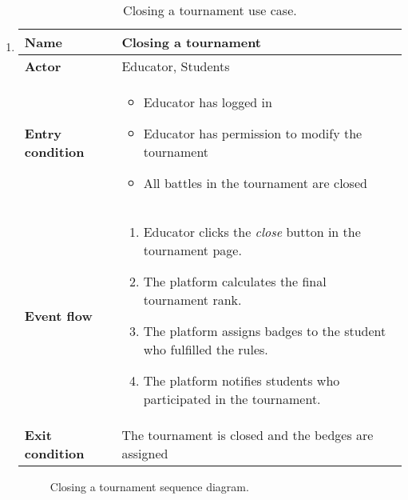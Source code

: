 \begin{enumerate}[label=\textbf{UC\arabic*}:,leftmargin=1.3cm]
    \item \textbf{}
          \begin{table}[H]
              \centering
              \begin{tabular}{|l|p{11.9cm}|}
                  \hline
                  \textbf{Name}            & Closing a tournament                                 \\\hline
                  \textbf{Actor}           & Educator, Students                                   \\\hline
                  \textbf{Entry condition} &
                  \begin{itemize}
                      \item Educator has logged in
                      \item Educator has permission to modify the tournament
                      \item All battles in the tournament are closed
                  \end{itemize}                           \\\hline
                  \textbf{Event flow}      &
                  \begin{enumerate}[label=\arabic*.]
                      \item Educator clicks the \emph{close} button in the tournament page.
                      \item The platform calculates the final tournament rank.
                      \item The platform assigns badges to the student who fulfilled the rules.
                      \item The platform notifies students who participated in the tournament.
                  \end{enumerate}        \\\hline
                  \textbf{Exit condition}  & The tournament is closed and the bedges are assigned \\\hline
              \end{tabular}
              \caption{Closing a tournament use case.}
              \label{table:Closing a tournament use case}
          \end{table}

          \begin{figure}[H]
              \centering
              \caption{Closing a tournament sequence diagram.}
              \label{fig:Closing a tournament use case}
          \end{figure}

\end{enumerate}

